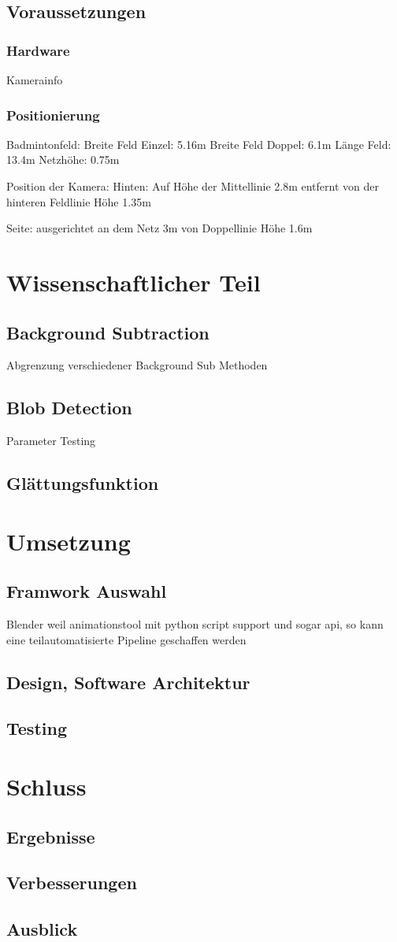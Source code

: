 \documentclass[11pt,a4paper,oldfontcommands]{memoir}
\begin{document}
\section{Voraussetzungen}
\subsection{Hardware}
Kamerainfo
\subsection{Positionierung}
Badmintonfeld: 
Breite Feld Einzel: 5.16m
Breite Feld Doppel: 6.1m
Länge Feld: 13.4m
Netzhöhe: 0.75m

Position der Kamera:
Hinten:
Auf Höhe der Mittellinie
2.8m entfernt von der hinteren Feldlinie
Höhe 1.35m

Seite:
ausgerichtet an dem Netz
3m von Doppellinie
Höhe 1.6m

\chapter{Wissenschaftlicher Teil}
\section{Background Subtraction}
Abgrenzung verschiedener Background Sub Methoden
\section{Blob Detection}
Parameter Testing
\section{Glättungsfunktion}

\chapter{Umsetzung}
\section{Framwork Auswahl}
Blender weil animationstool mit python script support und sogar api, so kann eine teilautomatisierte Pipeline geschaffen werden
\section{Design, Software Architektur}
\section{Testing}

\chapter{Schluss}
\section{Ergebnisse}
\section{Verbesserungen}
\section{Ausblick}





\end{document}
